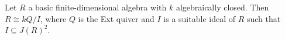 Let $R$ a basic finite-dimensional algebra with $k$ algebraically closed. Then
$R\cong kQ/I$, where $Q$ is the Ext quiver and $I$ is a suitable ideal of
$R$ such that $I \subseteq J(R)^2$.
